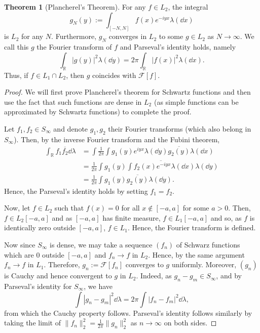 \documentclass[]{article}
\theoremstyle{definition}
\newtheorem{theorem}{Theorem}
\theoremstyle{definition}
\begin{document}
\begin{theorem}[Plancherel's Theorem]
  For any \(f \in L_2\), the integral 
  \[g_N(y) := \int_{[-N, N]} f(x)e^{-iyx}\lambda(\dd x)\]
  is \(L_2\) for any \(N\). Furthermore, \(g_N\) converges in \(L_2\) to some 
  \(g \in L_2\) as \(N \to \infty\). We call this \(g\) the Fourier transform 
  of \(f\) and Parseval's identity holds, namely
  \[\int_{\mathbb{R}} |g(y)|^2 \lambda(\dd y) =
     2\pi \int_{\mathbb{R}} |f(x)|^2 \lambda(\dd x).\]
  Thus, if \(f \in L_1 \cap L_2\), then \(g\) coincides with \(\mathcal{F}[f]\).
\end{theorem}
\begin{proof}
  We will first prove Plancherel's theorem for Schwartz functions and then use 
  the fact that such functions are dense in \(L_2\) (as simple functions can be  
  approximated by Schwartz functions) to complete the proof.

  Let \(f_1, f_2 \in S_\infty\) and denote \(g_1, g_2\) their Fourier transforms 
  (which also belong in \(S_\infty\)). Then, by the inverse Fourier transform 
  and the Fubini theorem, 
  \[\begin{split}
    \int_{\mathbb{R}} f_1 \overline{f_2} \dd \lambda & = 
    \int \frac{1}{2\pi} \int g_1(y)e^{iyx} \lambda(\dd y) \overline{g_2(y)} 
      \lambda(\dd x)\\
    & = \frac{1}{2\pi} \int g_1(y) \overline{\int f_2(x)e^{-iyx} 
      \lambda(\dd x)} \lambda(\dd y)\\
    & = \frac{1}{2\pi} \int g_1(y) \overline{g_2(y)} \lambda(\dd y).
  \end{split}\]
  Hence, the Parseval's identity holds by setting \(f_1 = f_2\).

  Now, let \(f \in L_2\) such that \(f(x) = 0\) for all \(x \not\in [-a, a]\) 
  for some \(a > 0\). Then, \(f \in L_2[-a, a]\) and as \([-a, a]\) has 
  finite measure, \(f \in L_1[-a, a]\) and so, as \(f\) is identically zero outside 
  \([-a, a]\), \(f \in L_1\). Hence, the Fourier transform is defined. 
  
  Now since 
  \(S_\infty\) is dense, we may take a sequence \((f_n)\) of Schwarz functions 
  which are 0 outside \([-a, a]\) and \(f_n \to f\) in \(L_2\). Hence, by the 
  same argument \(f_n \to f\) in \(L_1\). Therefore, \(g_n := \mathcal{F}[f_n]\)
  converges to \(g\) uniformly. Moreover, \((g_n)\) is Cauchy and hence convergent 
  to \(g\) in \(L_2\). Indeed, as \(g_n - g_m \in S_\infty\), and by Parseval's identity 
  for \(S_\infty\), we have 
  \[\int |g_n - g_m|^2 \dd \lambda = 2\pi \int |f_n - f_m|^2 \dd \lambda,\]
  from which the Cauchy property follows. Parseval's identity follows similarly 
  by taking the limit of \(\|f_n\|^2_2 = \frac{1}{2\pi}\|g_n\|^2_2\) as 
  \(n \to \infty\) on both sides.


\end{proof}
\end{document}
